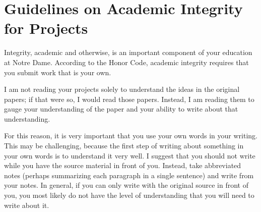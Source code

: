 \documentclass[11pt]{article}
\begin{document}
\newpage
\section*{Guidelines on Academic Integrity for Projects} 

Integrity, academic and otherwise, is an important component of your education at Notre Dame.   
According to the Honor Code, academic integrity requires that you submit work that is your own.  

I am not reading your projects solely to understand the ideas in the original papers; if that were so, I would read those papers.  Instead, I am reading them to gauge your understanding of the paper and your ability to write about that understanding.

For this reason, it is very important that you use your own words in your writing.  This may be challenging, because the first step of writing about something in your own words is to understand it very well.  I suggest that you should not write while you have the source material in front of you.  Instead, take abbreviated notes (perhaps summarizing each paragraph in a single sentence) and write from your notes.  In general, if you can only write with the original source in front of you, you most likely do not have the level of understanding that you will need to write about it.  
\end{document}
